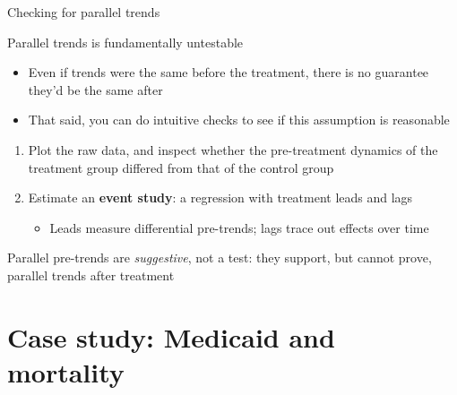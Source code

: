 \documentclass[compress, 8pt]{beamer}
\begin{document}
\begin{frame}{Checking for parallel trends}

Parallel trends is fundamentally untestable
\begin{itemize}
    \item Even if trends were the same before the treatment, there is no guarantee they'd be the same after
    \item That said, you can do intuitive checks to see if this assumption is reasonable
\end{itemize}

\vspace{3ex}
\begin{enumerate}
    \item Plot the raw data, and inspect whether the pre-treatment dynamics of the treatment group differed from that of the control group

    \item Estimate an \textbf{event study}: a regression with treatment leads and lags
    \begin{itemize}
        \item Leads measure differential pre-trends; lags trace out effects over time
    \end{itemize}
\end{enumerate}

\vspace{3ex}
Parallel pre-trends are \emph{suggestive}, not a test: they support, but cannot prove, parallel trends after treatment
\end{frame}

\section[Case study]{Case study: Medicaid and mortality}
\miniframesoff
\begin{frame}
    \tableofcontents[currentsection]
\end{frame}
\miniframeson
\end{document}
